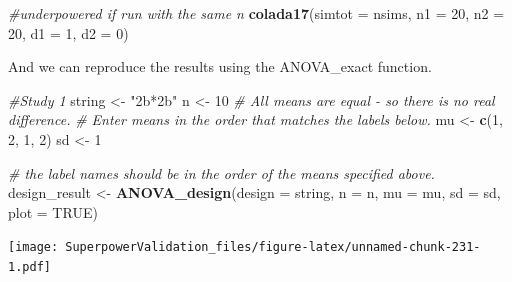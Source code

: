 \documentclass[]{book}
\newenvironment{Shaded}{\begin{snugshade}}{\end{snugshade}}
\newcommand{\CommentTok}[1]{\textcolor[rgb]{0.56,0.35,0.01}{\textit{#1}}}
\newcommand{\DataTypeTok}[1]{\textcolor[rgb]{0.13,0.29,0.53}{#1}}
\newcommand{\DecValTok}[1]{\textcolor[rgb]{0.00,0.00,0.81}{#1}}
\newcommand{\FloatTok}[1]{\textcolor[rgb]{0.00,0.00,0.81}{#1}}
\newcommand{\KeywordTok}[1]{\textcolor[rgb]{0.13,0.29,0.53}{\textbf{#1}}}
\newcommand{\NormalTok}[1]{#1}
\newcommand{\OperatorTok}[1]{\textcolor[rgb]{0.81,0.36,0.00}{\textbf{#1}}}
\newcommand{\OtherTok}[1]{\textcolor[rgb]{0.56,0.35,0.01}{#1}}
\newcommand{\StringTok}[1]{\textcolor[rgb]{0.31,0.60,0.02}{#1}}
\begin{document}
\begin{Shaded}
\begin{Highlighting}[]
\CommentTok{#underpowered if run with the same n}
\KeywordTok{colada17}\NormalTok{(}\DataTypeTok{simtot =}\NormalTok{ nsims, }\DataTypeTok{n1 =} \DecValTok{20}\NormalTok{, }\DataTypeTok{n2 =} \DecValTok{20}\NormalTok{, }\DataTypeTok{d1 =} \DecValTok{1}\NormalTok{, }\DataTypeTok{d2 =} \DecValTok{0}\NormalTok{)  }
\end{Highlighting}
\end{Shaded}

And we can reproduce the results using the ANOVA\_exact function.

\begin{Shaded}
\begin{Highlighting}[]
\CommentTok{#Study 1}
\NormalTok{string <-}\StringTok{ "2b*2b"}
\NormalTok{n <-}\StringTok{ }\DecValTok{10}
\CommentTok{# All means are equal - so there is no real difference.}
\CommentTok{# Enter means in the order that matches the labels below.}
\NormalTok{mu <-}\StringTok{ }\KeywordTok{c}\NormalTok{(}\DecValTok{1}\NormalTok{, }\DecValTok{2}\NormalTok{, }\DecValTok{1}\NormalTok{, }\DecValTok{2}\NormalTok{) }
\NormalTok{sd <-}\StringTok{ }\DecValTok{1}

\CommentTok{# the label names should be in the order of the means specified above.}
\NormalTok{design_result <-}\StringTok{ }\KeywordTok{ANOVA_design}\NormalTok{(}\DataTypeTok{design =}\NormalTok{ string,}
                   \DataTypeTok{n =}\NormalTok{ n, }
                   \DataTypeTok{mu =}\NormalTok{ mu, }
                   \DataTypeTok{sd =}\NormalTok{ sd, }
                   \DataTypeTok{plot =} \OtherTok{TRUE}\NormalTok{)}
\end{Highlighting}
\end{Shaded}

\texttt{[image: SuperpowerValidation\_files/figure-latex/unnamed-chunk-231-1.pdf]}

\begin{Shaded}
\end{Shaded}
\end{document}

